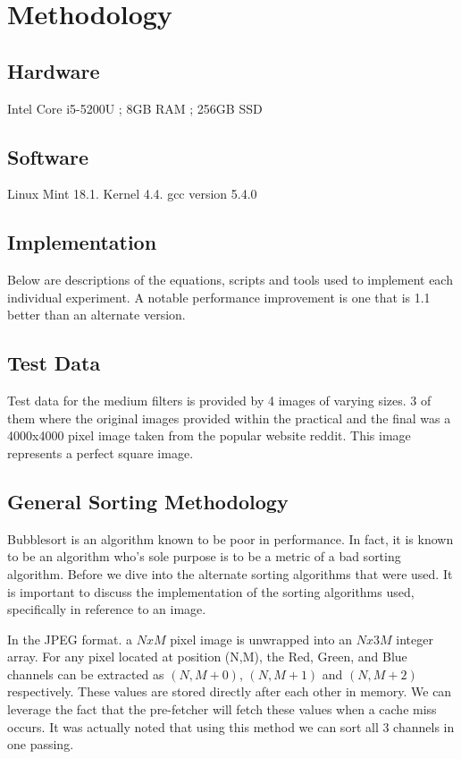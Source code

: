 \section{Methodology}
\subsection{Hardware}
Intel Core i5-5200U ; 8GB RAM ; 256GB SSD
\subsection{Software}
Linux Mint 18.1. Kernel 4.4.
gcc version 5.4.0
\subsection{Implementation}
Below are descriptions of the equations, scripts and tools used to implement each individual experiment. A notable performance improvement is one that is 1.1 better than an alternate version.\\
\subsection{Test Data}
Test data for the medium filters is provided by 4 images of varying sizes. 3 of them where the original images provided within the practical and the final was a 4000x4000 pixel image taken from the popular website reddit. This image represents a perfect square image.\\

\subsection{General Sorting Methodology}
Bubblesort is an algorithm known to be poor in performance. In fact, it is known to be an algorithm who's sole purpose is to be a metric of a bad sorting algorithm. Before we dive into the alternate sorting algorithms that were used. It is important to discuss the implementation of the sorting algorithms used, specifically in reference to an image.

In the JPEG format. a $NxM$ pixel image is unwrapped into an $Nx3M$ integer array. For any pixel located at position (N,M), the Red, Green, and Blue channels can be extracted as $(N, M +0)$, $(N, M+1)$ and $(N, M+2)$ respectively. These values are stored directly after each other in memory. We can leverage the fact that the pre-fetcher will fetch these values when a cache miss occurs. It was actually noted that using this method we can sort all 3 channels in one passing. \\


